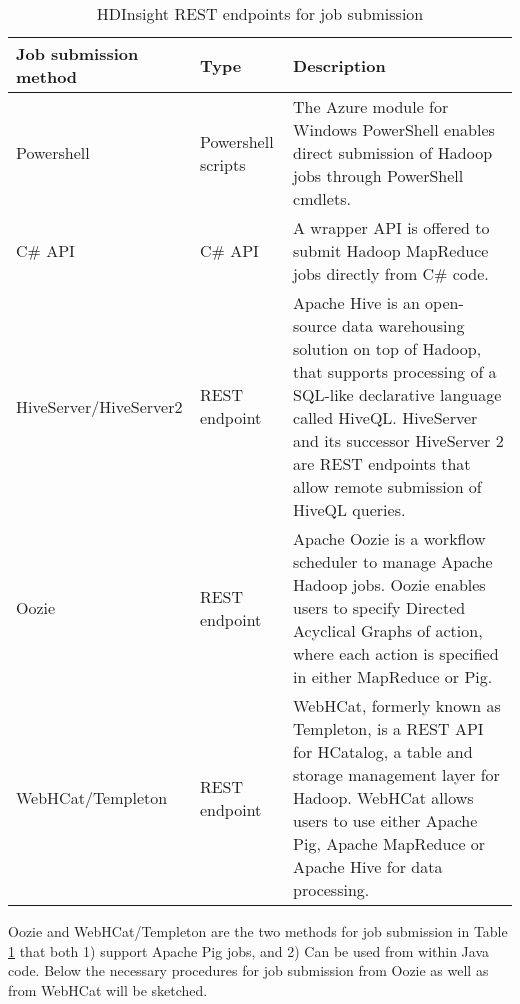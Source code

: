 \begin{table}
\centering
\begin{tabular}{p{4.2cm}p{2.6cm}p{5.5cm}}\toprule
Job submission method & Type & Description \\
\midrule
Powershell & Powershell scripts & The Azure module for Windows PowerShell enables direct submission of Hadoop jobs through PowerShell cmdlets.\\
C\# API & C\# API & A wrapper API is offered to submit Hadoop MapReduce jobs directly from C\# code.\\
HiveServer/HiveServer2 & REST endpoint & Apache Hive \cite{Thusoo2009} is an open-source data warehousing solution on top of Hadoop, that supports processing of a SQL-like declarative language called HiveQL. HiveServer and its successor HiveServer 2 are REST endpoints that allow remote submission of HiveQL queries.\\
Oozie & REST endpoint & Apache Oozie \cite{Islam2012} is a workflow scheduler to manage Apache Hadoop jobs. Oozie enables users to specify Directed Acyclical Graphs of action, where each action is specified in either MapReduce or Pig.\\
WebHCat/Templeton & REST endpoint & WebHCat, formerly known as Templeton, is a REST API for HCatalog, a table and storage management layer for Hadoop. WebHCat allows users to use either Apache Pig, Apache MapReduce or Apache Hive for data processing.\\	
\bottomrule
\end{tabular}
\caption{HDInsight REST endpoints for job submission}
\label{tbl:hdinsight_endpoints}
\end{table}

Oozie and WebHCat/Templeton are the two methods for job submission in Table \ref{tbl:hdinsight_endpoints} that both 1) support Apache Pig jobs, and 2) Can be used from within Java code. Below the necessary procedures for job submission from Oozie as well as from WebHCat will be sketched.\\

